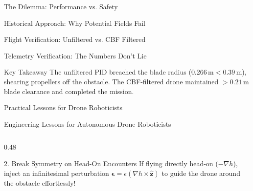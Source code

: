\documentclass[aspectratio=169,10pt]{beamer}
\begin{document}
\begin{frame}{The Dilemma: Performance vs. Safety}
\begin{frame}{Historical Approach: Why Potential Fields Fail}
\begin{frame}{Flight Verification: Unfiltered vs. CBF Filtered}
\begin{frame}{Telemetry Verification: The Numbers Don't Lie}
  \begin{block}{Key Takeaway}
    The unfiltered PID breached the blade radius ($0.266\,\text{m} < 0.39\,\text{m}$), shearing propellers off the obstacle. The CBF-filtered drone maintained $> 0.21\,\text{m}$ blade clearance and completed the mission.
  \end{block}
\end{frame}

\begin{frame}{Practical Lessons for Drone Roboticists}
\begin{frame}{Engineering Lessons for Autonomous Drone Roboticists}
  \begin{columns}[T]
    \begin{column}{0.48\textwidth}

      \begin{block}{2. Break Symmetry on Head-On Encounters}
        \small
        If flying directly head-on ($-\nabla h$), inject an infinitesimal perturbation $\bm{\epsilon} = \epsilon (\nabla h \times \hat{\mathbf{z}})$ to guide the drone around the obstacle effortlessly!
      \end{block}
    \end{column}


\end{columns}
\end{frame}
\end{frame}
\end{frame}
\end{frame}
\end{frame}
\end{document}
